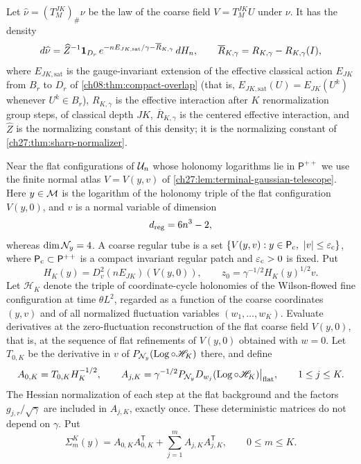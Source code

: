 \begin{definition}\label{ch31:def:normal-response-rows}
Let $\widehat\nu=(T_M^{JK})_\#\nu$ be the law of the coarse field $V=T_M^{JK}U$ under $\nu$. It has the density
\[
 d\widehat\nu=\widehat Z^{-1}\mathbf 1_{D_r}\,e^{-nE_{JK,\mathrm{sat}}/\gamma-\overline R_{K,\gamma}}\,dH_n,\qquad
 \overline R_{K,\gamma}=R_{K,\gamma}-R_{K,\gamma}(I),
\]
where $E_{JK,\mathrm{sat}}$ is the gauge-invariant extension of the effective classical action $E_{JK}$ from $B_r$ to $D_r$ of \cref{ch08:thm:compact-overlap} (that is, $E_{JK,\mathrm{sat}}(U)=E_{JK}(U^k)$ whenever $U^k\in B_r$), $R_{K,\gamma}$ is the effective interaction after $K$ renormalization group steps, of classical depth $JK$, $\overline R_{K,\gamma}$ is the centered effective interaction, and $\widehat Z$ is the normalizing constant of this density; it is the normalizing constant of \cref{ch27:thm:sharp-normalizer}.

Near the flat configurations of $\mathcal U_{n}$ whose holonomy logarithms lie in $\mathsf P^{++}$ we use the finite normal atlas $V=V(y,v)$ of \cref{ch27:lem:terminal-gaussian-telescope}. Here $y\in\mathcal M$ is the logarithm of the holonomy triple of the flat configuration $V(y,0)$, and $v$ is a normal variable of dimension
\[
 d_{\rm reg}=6n^3-2,
\]
whereas $\dim\mathcal N_{y}=4$. A coarse regular tube is a set $\{V(y,v):y\in\mathsf P_{\rm c},\ \abs v\le\varepsilon_{\rm c}\}$, where $\mathsf P_{\rm c}\subset\mathsf P^{++}$ is a compact invariant regular patch and $\varepsilon_{\rm c}>0$ is fixed. Put
\[
 H_K(y)=D_v^2(nE_{JK})(V(y,0)),\qquad z_0=\gamma^{-1/2}H_K(y)^{1/2}v.
\]
Let $\mathscr H_K$ denote the triple of coordinate-cycle holonomies of the Wilson-flowed fine configuration at time $\theta L^2$, regarded as a function of the coarse coordinates $(y,v)$ and of all normalized fluctuation variables $(w_1,\dots,w_K)$. Evaluate derivatives at the zero-fluctuation reconstruction of the flat coarse field $V(y,0)$, that is, at the sequence of flat refinements of $V(y,0)$ obtained with $w=0$. Let $T_{0,K}$ be the derivative in $v$ of $P_{\mathcal N_{y}}(\operatorname{Log}\circ\mathscr H_K)$ there, and define
\[
 A_{0,K}=T_{0,K}H_K^{-1/2},\qquad
 A_{j,K}=\gamma^{-1/2}P_{\mathcal N_{y}}D_{w_j}(\operatorname{Log}\circ\mathscr H_K)\big|_{\rm flat},\qquad1\le j\le K.
\]
The Hessian normalization of each step at the flat background and the factors $g_{j,r}/\sqrt\gamma$ are included in $A_{j,K}$, exactly once. These deterministic matrices do not depend on $\gamma$. Put
\[
 \Sigma_m^K(y)=A_{0,K}A_{0,K}^{\mathsf T}+\sum_{j=1}^mA_{j,K}A_{j,K}^{\mathsf T},\qquad0\le m\le K.
\]
\end{definition}

